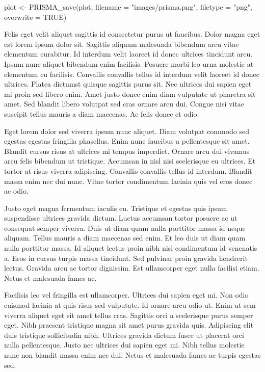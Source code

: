 \documentclass[
  BCOR=10mm, %
  DIV=12, %
  twoside, %
  headsepline, %
  listof=totoc, %
  bibliography=totoc, %
  index=totoc, %
  abstract=true, %
  numbers=noenddot, %
]{cs-thesis}
\newenvironment{Shaded}{\begin{snugshade}}{\end{snugshade}}
\newcommand{\AttributeTok}[1]{\textcolor[rgb]{0.40,0.45,0.13}{#1}}
\newcommand{\ConstantTok}[1]{\textcolor[rgb]{0.56,0.35,0.01}{#1}}
\newcommand{\FunctionTok}[1]{\textcolor[rgb]{0.28,0.35,0.67}{#1}}
\newcommand{\NormalTok}[1]{\textcolor[rgb]{0.00,0.23,0.31}{#1}}
\newcommand{\OtherTok}[1]{\textcolor[rgb]{0.00,0.23,0.31}{#1}}
\newcommand{\StringTok}[1]{\textcolor[rgb]{0.13,0.47,0.30}{#1}}
\begin{document}
\begin{Shaded}
\begin{Highlighting}[]
\NormalTok{plot }\OtherTok{\textless{}{-}} \FunctionTok{PRISMA\_save}\NormalTok{(plot, }\AttributeTok{filename =} \StringTok{"images/prisma.png"}\NormalTok{, }\AttributeTok{filetype =} \StringTok{"png"}\NormalTok{, }\AttributeTok{overwrite =} \ConstantTok{TRUE}\NormalTok{)}
\end{Highlighting}
\end{Shaded}

    Felis eget velit aliquet sagittis id consectetur purus ut faucibus.
    Dolor magna eget est lorem ipsum dolor sit. Sagittis aliquam
    malesuada bibendum arcu vitae elementum curabitur. Id interdum velit
    laoreet id donec ultrices tincidunt arcu. Ipsum nunc aliquet
    bibendum enim facilisis. Posuere morbi leo urna molestie at
    elementum eu facilisis. Convallis convallis tellus id interdum velit
    laoreet id donec ultrices. Platea dictumst quisque sagittis purus
    sit. Nec ultrices dui sapien eget mi proin sed libero enim. Amet
    justo donec enim diam vulputate ut pharetra sit amet. Sed blandit
    libero volutpat sed cras ornare arcu dui. Congue nisi vitae suscipit
    tellus mauris a diam maecenas. Ac felis donec et odio.

    Eget lorem dolor sed viverra ipsum nunc aliquet. Diam volutpat
    commodo sed egestas egestas fringilla phasellus. Enim nunc faucibus
    a pellentesque sit amet. Blandit cursus risus at ultrices mi tempus
    imperdiet. Ornare arcu dui vivamus arcu felis bibendum ut tristique.
    Accumsan in nisl nisi scelerisque eu ultrices. Et tortor at risus
    viverra adipiscing. Convallis convallis tellus id interdum. Blandit
    massa enim nec dui nunc. Vitae tortor condimentum lacinia quis vel
    eros donec ac odio.

    Justo eget magna fermentum iaculis eu. Tristique et egestas quis
    ipsum suspendisse ultrices gravida dictum. Luctus accumsan tortor
    posuere ac ut consequat semper viverra. Duis ut diam quam nulla
    porttitor massa id neque aliquam. Tellus mauris a diam maecenas sed
    enim. Et leo duis ut diam quam nulla porttitor massa. Id aliquet
    lectus proin nibh nisl condimentum id venenatis a. Eros in cursus
    turpis massa tincidunt. Sed pulvinar proin gravida hendrerit lectus.
    Gravida arcu ac tortor dignissim. Est ullamcorper eget nulla
    facilisi etiam. Netus et malesuada fames ac.

    Facilisis leo vel fringilla est ullamcorper. Ultrices dui sapien
    eget mi. Non odio euismod lacinia at quis risus sed vulputate. Id
    ornare arcu odio ut. Enim ut sem viverra aliquet eget sit amet
    tellus cras. Sagittis orci a scelerisque purus semper eget. Nibh
    praesent tristique magna sit amet purus gravida quis. Adipiscing
    elit duis tristique sollicitudin nibh. Ultrices gravida dictum fusce
    ut placerat orci nulla pellentesque. Justo nec ultrices dui sapien
    eget mi. Nibh tellus molestie nunc non blandit massa enim nec dui.
    Netus et malesuada fames ac turpis egestas sed.
\end{document}
